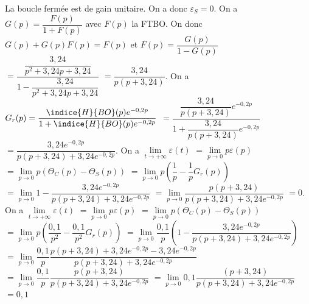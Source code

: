 \begin{corrigebox}
La boucle fermée est de gain unitaire. On a donc $\varepsilon_S = 0$.
On a $G(p)=\dfrac{F(p)}{1+F(p)}$ avec $F(p)$ la FTBO. On donc $G(p)+G(p)F(p)=F(p)$ et
 $F(p)=\dfrac{G(p)}{1-G(p)} $
 $ = \dfrac{\dfrac{3,24}{p^2+3,24 p+3,24}}{1-\dfrac{3,24}{p^2+3,24 p+3,24}} $
  $ = \dfrac{3,24}{p\left(p+3,24\right)} $.
On a $G_r(p)=\dfrac{\indice{H}{BO}(p)e^{-0,2 p}}{1+\indice{H}{BO}(p)e^{-0,2 p}}$ 
$=\dfrac{\dfrac{3,24}{p\left(p+3,24\right)}e^{-0,2 p}}{1+\dfrac{3,24}{p\left(p+3,24\right)}e^{-0,2 p}}$
$=\dfrac{3,24e^{-0,2 p}}{p\left(p+3,24\right)+3,24e^{-0,2 p}}$.
On a $\lim\limits_{t\to +\infty} \varepsilon(t) $
$= \lim\limits_{p\to 0} p\varepsilon(p) $
$= \lim\limits_{p\to 0} p\left( \Theta_C(p) - \Theta_S(p) \right) $
$= \lim\limits_{p\to 0} p\left( \dfrac{1}{p}-\dfrac{1}{p} G_r(p) \right) $
$= \lim\limits_{p\to 0}  1-\dfrac{3,24e^{-0,2 p}}{p\left(p+3,24\right)+3,24e^{-0,2 p}} $
$= \lim\limits_{p\to 0}  \dfrac{p\left(p+3,24\right)}{p\left(p+3,24\right)+3,24e^{-0,2 p}} $ $=0$.
On a $\lim\limits_{t\to +\infty} \varepsilon(t) $
$= \lim\limits_{p\to 0} p\varepsilon(p) $
$= \lim\limits_{p\to 0} p\left( \Theta_C(p) - \Theta_S(p) \right) $
$= \lim\limits_{p\to 0} p\left( \dfrac{0,1}{p^2}-\dfrac{0,1}{p^2} G_r(p) \right) $
$= \lim\limits_{p\to 0}  \dfrac{0,1}{p}\left(1-\dfrac{3,24e^{-0,2 p}}{p\left(p+3,24\right)+3,24e^{-0,2 p}} \right) $
$= \lim\limits_{p\to 0}  \dfrac{0,1}{p}\dfrac{p\left(p+3,24\right)+3,24e^{-0,2 p}-3,24e^{-0,2 p}}{p\left(p+3,24\right)+3,24e^{-0,2 p}}  $
$= \lim\limits_{p\to 0}  \dfrac{0,1}{p}\dfrac{p\left(p+3,24\right)}{p\left(p+3,24\right)+3,24e^{-0,2 p}}  $
$= \lim\limits_{p\to 0}  0,1\dfrac{\left(p+3,24\right)}{p\left(p+3,24\right)+3,24e^{-0,2 p}}  $
$=  0,1 $
\end{corrigebox}
